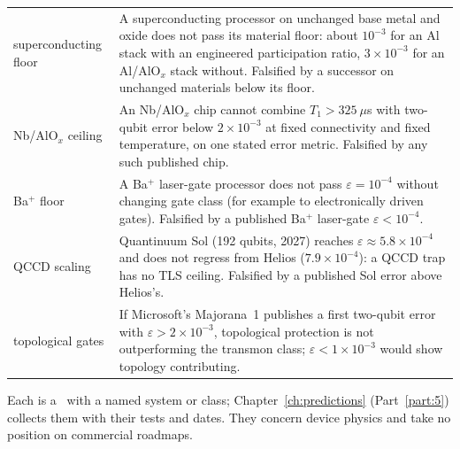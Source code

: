 \begin{center}\small
\begin{tabularx}{\textwidth}{@{}>{\raggedright\arraybackslash}p{}>{\raggedright\arraybackslash}X@{}}\toprule
superconducting floor & A superconducting processor on unchanged base metal and oxide does not pass its material floor: about $10^{-3}$ for an Al stack with an engineered participation ratio, $3\times10^{-3}$ for an Al/AlO$_x$ stack without. Falsified by a successor on unchanged materials below its floor. \\
Nb/AlO$_x$ ceiling & An Nb/AlO$_x$ chip cannot combine $T_1>325\ \mu$s with two-qubit error below $2\times10^{-3}$ at fixed connectivity and fixed temperature, on one stated error metric. Falsified by any such published chip. \\
Ba$^+$ floor & A Ba$^+$ laser-gate processor does not pass $\varepsilon=10^{-4}$ without changing gate class (for example to electronically driven gates). Falsified by a published Ba$^+$ laser-gate $\varepsilon<10^{-4}$. \\
QCCD scaling & Quantinuum Sol (192 qubits, 2027) reaches $\varepsilon\approx5.8\times10^{-4}$ and does not regress from Helios ($7.9\times10^{-4}$): a QCCD trap has no TLS ceiling. Falsified by a published Sol error above Helios's. \\
topological gates & If Microsoft's Majorana~1 publishes a first two-qubit error with $\varepsilon>2\times10^{-3}$, topological protection is not outperforming the transmon class; $\varepsilon<1\times10^{-3}$ would show topology contributing. \\\bottomrule
\end{tabularx}
\end{center}
\noindent Each is a \prediction\ with a named system or class; Chapter~\ref{ch:predictions} (Part~\ref{part:5}) collects them with their tests and dates.
They concern device physics and take no position on commercial roadmaps.
